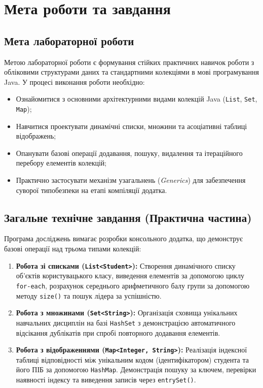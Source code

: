 \section{Мета роботи та завдання}

\subsection{Мета лабораторної роботи}

Метою лабораторної роботи є формування стійких практичних навичок роботи 
з обліковими структурами даних та стандартними колекціями в мові програмування 
Java. У процесі виконання роботи необхідно:
\begin{itemize}
    \item 
    Ознайомитися з основними архітектурними видами колекцій Java (\texttt{List}, 
    \texttt{Set}, \texttt{Map});
    \item 
    Навчитися проектувати динамічні списки, множини та асоціативні 
    таблиці відображень;
    \item 
    Опанувати базові операції додавання, пошуку, видалення та ітераційного 
    перебору елементів колекцій;
    \item 
    Практично застосувати механізм узагальнень (\textit{Generics}) для 
    забезпечення суворої типобезпеки на етапі компіляції додатка.
\end{itemize}

\subsection{Загальне технічне завдання (Практична частина)}

Програма досліджень вимагає розробки консольного додатка, що демонструє 
базові операції над трьома типами колекцій:
\begin{enumerate}
    \item \textbf{Робота зі списками (\texttt{List<Student>}):} 
    Створення динамічного списку об'єктів користувацького класу, виведення 
    елементів за допомогою циклу \texttt{for-each}, розрахунок середнього 
    арифметичного балу групи за допомогою методу \texttt{size()} та пошук 
    лідера за успішністю.
    \item \textbf{Робота з множинами (\texttt{Set<String>}):} 
    Організація сховища унікальних навчальних дисциплін на 
    базі \texttt{HashSet} з демонстрацією автоматичного відсікання дублікатів 
    при спробі повторного додавання елементів.
    \item \textbf{Робота з відображеннями (\texttt{Map<Integer, String>}):} 
    Реалізація індексної таблиці відповідності між унікальним кодом (ідентифікатором) 
    студента та його ПІБ за допомогою \texttt{HashMap}. Демонстрація пошуку за ключем, 
    перевірки наявності індексу та виведення записів через \texttt{entrySet()}.
\end{enumerate}

